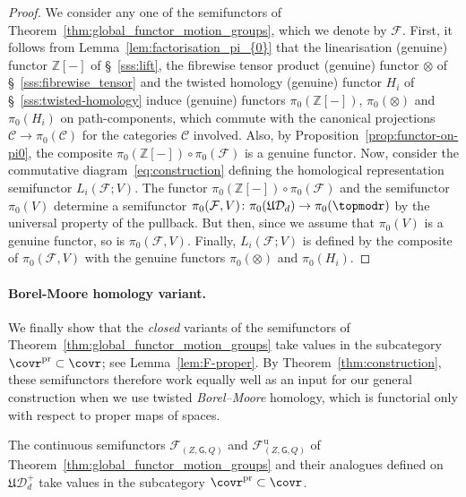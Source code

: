 \documentclass[AHL,Unicode,published]{cedram}
\newcommand{\pr}{\ensuremath{\mathrm{pr}}}
\newcommand{\unt}{\mathrm{u}}
\newcommand{\fU}{\ensuremath{\mathfrak{U}}}
\newcommand{\sG}{\mathsf{G}}
\newcommand{\cC}{\mathcal{C}}
\newcommand{\cD}{\mathcal{D}}
\newcommand{\cF}{\mathcal{F}}
\newcommand{\bZ}{\mathbb{Z}}
\begin{document}
\begin{proof}
We consider any one of the semifunctors of Theorem~\ref{thm:global_functor_motion_groups}, which we denote by $\cF$. First, it follows from Lemma~\ref{lem:factorisation_pi_{0}} that the linearisation (genuine) functor $\bZ[-]$ of \S~\ref{sss:lift}, the fibrewise tensor product (genuine) functor $\otimes$ of \S~\ref{sss:fibrewise_tensor} and the twisted homology (genuine) functor $H_{i}$ of \S~\ref{sss:twisted-homology} induce (genuine) functors $\pi_{0}(\bZ[-])$, $\pi_{0}(\otimes)$ and $\pi_{0}(H_{i})$ on path-components, which commute with the canonical projections $\cC \to \pi_{0}(\cC)$ for the categories $\cC$ involved. Also, by Proposition~\ref{prop:functor-on-pi0}, the composite $\pi_{0}(\bZ[-])\circ \pi_{0}(\cF)$ is a genuine functor. Now, consider the commutative diagram~\eqref{eq:construction} defining the homological representation semifunctor $L_{i}(\cF;V)$. The functor $\pi_{0}(\bZ[-])\circ \pi_{0}(\cF)$ and the semifunctor $\pi_{0}(V)$ determine a semifunctor $\pi_{0}(\cF,V) \colon \pi_{0}(\fU\cD_{d}) \to \pi_{0}(\topmodr)$ by the universal property of the pullback. But then, since we assume that $\pi_{0}(V)$ is a genuine functor, so is $\pi_{0}(\cF,V)$. Finally, $L_{i}(\cF;V)$ is defined by the composite of $\pi_{0}(\cF,V)$ with the genuine functors $\pi_{0}(\otimes)$ and $\pi_{0}(H_{i})$.
\end{proof}


\paragraph*{Borel-Moore homology variant.}
We finally show that the \emph{closed} variants of the semifunctors of Theorem~\ref{thm:global_functor_motion_groups} take values in the subcategory $\covr^{\pr} \subset \covr$; see Lemma~\ref{lem:F-proper}. By Theorem~\ref{thm:construction}, these semifunctors therefore work equally well as an input for our general construction when we use twisted \emph{Borel--Moore} homology, which is functorial only with respect to proper maps of spaces.

\begin{lemm}\label{lem:F-proper}
The continuous semifunctors $\cF_{(Z,\sG,Q)}$ and $\cF^{\unt}_{(Z,\sG,Q)}$ of Theorem~\ref{thm:global_functor_motion_groups} and their analogues defined on $\fU\cD_{d}^{+}$ take values in the subcategory $\covr^{\pr} \subset \covr$.
\end{lemm}
\end{document}

